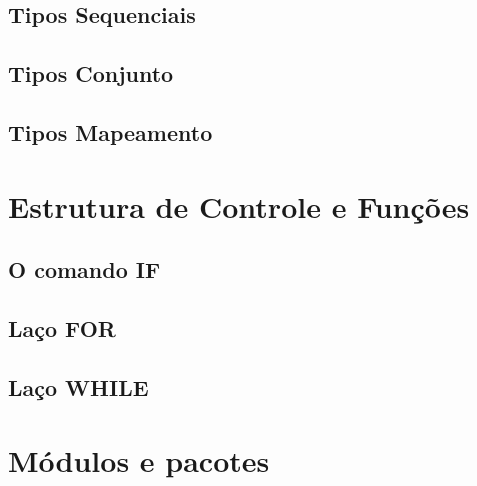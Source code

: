             \subsection{Tipos Sequenciais}


            \subsection{Tipos Conjunto}


            \subsection{Tipos Mapeamento}




    \section{Estrutura de Controle e Fun\c{c}\~{o}es}

            \subsection{O comando IF}


            \subsection{La\c{c}o FOR}

            \subsection{La\c{c}o WHILE}


    \section{M\'{o}dulos e pacotes}



